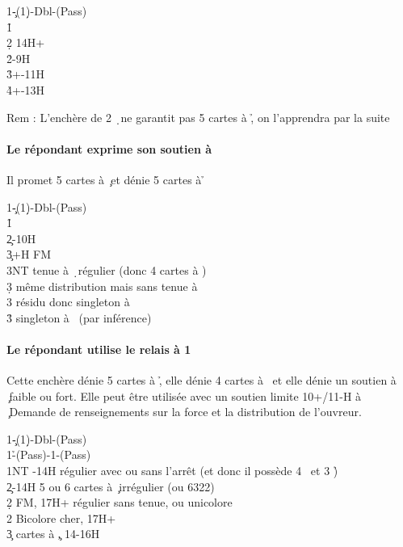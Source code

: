 \documentclass[a4paper]{article}
\begin{document}
\begin{bidtable}
1\c-(1\d)-Dbl-(Pass)\\
1\h\+\\
2\d \> 14H+\\
2\h {}-9H\\
3\h {}+-11H\\
4\h {}+-13H\-
\end{bidtable}

Rem : L’enchère de 2 \d\ ne garantit pas 5 cartes à \h , on l’apprendra par la suite

\paragraph{Le répondant exprime son soutien à \pdfc}

Il promet 5 cartes à \c\ et dénie 5 cartes à \h 

\begin{bidtable}
1\c-(1\d)-Dbl-(Pass)\\
1\h\+\\
2\c {}-10H\\
3\c {}+H FM\+\\
3NT \> tenue à \d\ régulier (donc 4 cartes à \s )\\
3\d \> même distribution mais sans tenue à \d \\
3\s \> résidu donc singleton à \d \\
3\h \> singleton à \s\ (par inférence)\-\-
\end{bidtable}

\paragraph{Le répondant utilise le relais à 1 \pdfs}

Cette enchère dénie 5 cartes à \h , elle dénie 4 cartes à \s\ et elle dénie un soutien à \c\ faible ou fort.
Elle peut être utilisée avec un soutien limite 10+/11-H à \c\ 
Demande de renseignements sur la force et la distribution de l’ouvreur.

\begin{bidtable}
1\c-(1\d)-Dbl-(Pass)\\
1\h-(Pass)-1\s-(Pass)\\
1NT -14H régulier avec ou sans l’arrêt (et donc il possède 4 \s\ et 3 \h )\\
2\c \> 12-14H 5 ou 6 cartes à \c\ irrégulier (ou 6322)\\
2\d \> FM, 17H+ régulier sans tenue, ou unicolore \c \\
2\s \> Bicolore cher, 17H+\\
3\c {} cartes à \c , 14-16H
\end{bidtable}
\end{document}

